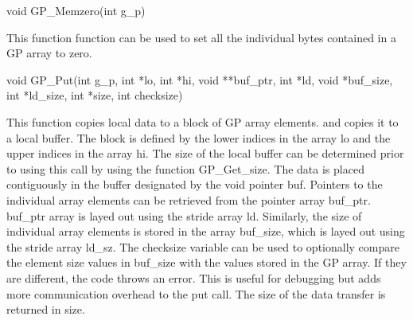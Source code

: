 \documentclass[12pt]{article}
\begin{document}


\begin{capi}
\begin{ccode}
void GP_Memzero(int g_p)
\end{ccode}
\begin{funcargs}
\end{funcargs}
\end{capi}

\wcoll

\begin{desc}

This function function can be used to set all the individual bytes
contained in a GP array to zero.

\end{desc}


\begin{capi}
\begin{ccode}
void GP_Put(int g_p, int *lo, int *hi, void **buf_ptr, int *ld,
             void *buf_size, int *ld_size, int *size, int checksize)
\end{ccode}
\begin{funcargs}
\end{funcargs}
\end{capi}

\ncoll

\begin{desc}

This function copies local data to a block of GP array elements.
and copies it to a local
buffer. The block is defined by the lower indices in the array lo
and the upper indices in the array hi. The size of the local buffer can be
determined prior to using this call by using the function GP\_Get\_size. The
data is placed contiguously in the buffer designated by the void pointer buf.
Pointers to the individual array elements can be retrieved from the pointer
array buf\_ptr. buf\_ptr array is layed out using the stride array ld. Similarly,
the size of individual array elements is stored in the array buf\_size, which is
layed out using the stride array ld\_sz. The checksize variable can be used to
optionally compare the element size values in buf\_size with the values stored in
the GP array. If they are different, the code throws an error. This is useful
for debugging but adds more communication overhead to the put call. The size of
the data transfer is returned in size.

\end{desc}
\end{document}
